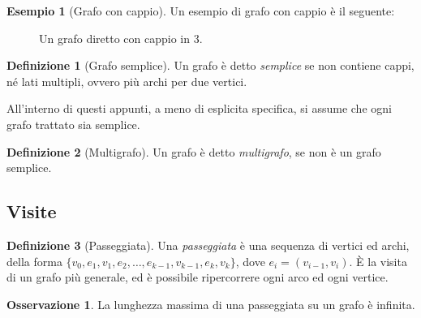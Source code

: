 \documentclass[14pt]{extreport}
\theoremstyle{definition}
\newtheorem{definition}{Definizione}[subsection]
\theoremstyle{definition}
\newtheorem{remark}{Osservazione}[subsection]
\newtheorem{example}{Esempio}[subsection]
\begin{document}
\begin{example}[Grafo con cappio]
    Un esempio di grafo con cappio è il seguente:

    \begin{figure}[H]
        \centering
        \caption{Un grafo diretto con cappio in 3.}
    \end{figure}
\end{example}

\begin{definition}[Grafo semplice]
    Un grafo è detto \textit{semplice} se non contiene cappi, né lati multipli, ovvero più archi per due vertici.

    All'interno di questi appunti, a meno di esplicita specifica, si assume che ogni grafo trattato sia semplice.
\end{definition}

\begin{definition}[Multigrafo]
    Un grafo è detto \textit{multigrafo}, se non è un grafo semplice.
\end{definition}

\subsection{Visite}

\begin{definition}[Passeggiata]
    Una \textit{passeggiata} è una sequenza di vertici ed archi, della forma $\{v_0, e_1, v_1, e_2, \ldots , e_{k - 1}, v_{k - 1}, e_k, v_k\}$, dove $e_i=(v_{i - 1}, v_i)$. È la visita di un grafo più generale, ed è possibile ripercorrere ogni arco ed ogni vertice.
\end{definition}

\begin{remark}
    La lunghezza massima di una passeggiata su un grafo è infinita.
\end{remark}
\end{document}
